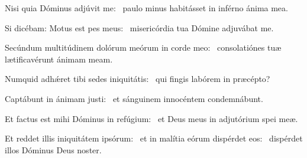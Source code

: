 \item Nisi quia Dóminus adjúvit me:~\psstar{} paulo minus habitásset in inférno ánima mea.

\item Si dicébam: Motus est pes meus:~\psstar{} misericórdia tua Dómine adjuvábat me.

\item Secúndum multitúdinem dolórum meórum in corde meo:~\psstar{} consolatiónes tuæ lætificavérunt ánimam meam.

\item Numquid adhǽret tibi sedes iniquitátis:~\psstar{} qui fingis labórem in præcépto?

\item Captábunt in ánimam justi:~\psstar{} et sánguinem innocéntem condemnábunt.

\item Et factus est mihi Dóminus in refúgium:~\psstar{} et Deus meus in adjutórium spei meæ.

\item Et reddet illis iniquitátem ipsórum:~\pscross{} et in malítia eórum dispérdet eos:~\psstar{} dispérdet illos Dóminus Deus noster.

